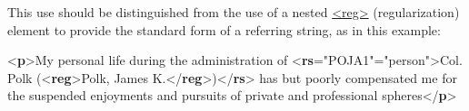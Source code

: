 This use should be distinguished from the use of a nested \hyperref[TEI.reg]{<reg>} (regularization) element to provide the standard form of a referring string, as in this example: \par\bgroup{}\exampleFont \begin{shaded}\noindent\mbox{}{<\textbf{p}>}My personal life during\mbox{}\newline 
 the administration of {<\textbf{rs}\hspace*{1em}{key}="{POJA1}"\hspace*{1em}{type}="{person}">}Col. Polk\mbox{}\newline 
\hspace*{1em}\hspace*{1em} ({<\textbf{reg}>}Polk, James K.{</\textbf{reg}>}){</\textbf{rs}>} has but poorly compensated me for the\mbox{}\newline 
 suspended enjoyments and pursuits of private and professional\mbox{}\newline 
 spheres{</\textbf{p}>}\end{shaded}\egroup\par \par
